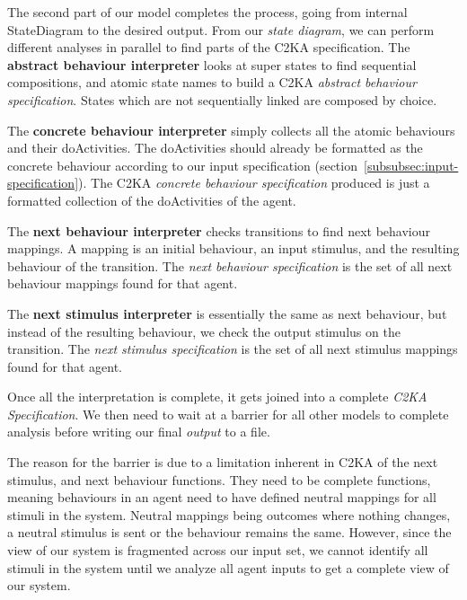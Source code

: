 The second part of our model completes the process, going from internal StateDiagram to the desired output.
From our \textit{state diagram}, we can perform different analyses in parallel to find parts of the C2KA specification.
The \textbf{abstract behaviour interpreter} looks at super states to find sequential compositions,
and atomic state names to build a C2KA \textit{abstract behaviour specification}.
States which are not sequentially linked are composed by choice.

The \textbf{concrete behaviour interpreter} simply collects all the atomic behaviours and their doActivities.
The doActivities should already be formatted as the concrete behaviour according to our input specification (section~\ref{subsubsec:input-specification}).
The C2KA \textit{concrete behaviour specification} produced is just a formatted collection of the doActivities of the agent.

The \textbf{next behaviour interpreter} checks transitions to find next behaviour mappings.
A mapping is an initial behaviour, an input stimulus, and the resulting behaviour of the transition.
The \textit{next behaviour specification} is the set of all next behaviour mappings found for that agent.

The \textbf{next stimulus interpreter} is essentially the same as next behaviour,
but instead of the resulting behaviour, we check the output stimulus on the transition.
The \textit{next stimulus specification} is the set of all next stimulus mappings found for that agent.

Once all the interpretation is complete, it gets joined into a complete \textit{C2KA Specification}.
We then need to wait at a barrier for all other models to complete analysis before writing our final \textit{output} to a file.

The reason for the barrier is due to a limitation inherent in C2KA of the next stimulus, and next behaviour functions.
They need to be complete functions,
meaning behaviours in an agent need to have defined neutral mappings for all stimuli in the system.
Neutral mappings being outcomes where nothing changes, a neutral stimulus is sent or the behaviour remains the same.
However, since the view of our system is fragmented across our input set,
we cannot identify all stimuli in the system until we analyze all agent inputs to get a complete view of our system.


